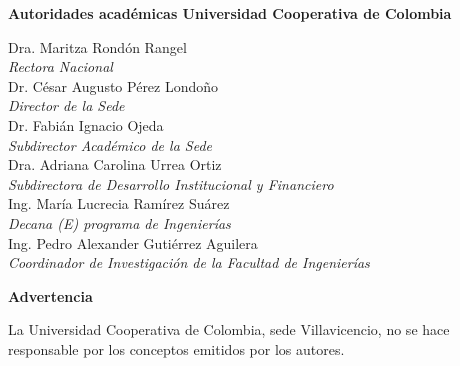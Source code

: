 \documentclass[12pt, letterpaper]{article}
\begin{document}
\newpage
\thispagestyle{empty}
\begin{center}
    \vspace*{2cm}
    {\large \bfseries Autoridades académicas Universidad Cooperativa de Colombia\par}
    \vspace{2cm}
\end{center}
\begin{flushleft}
    \large
    Dra. Maritza Rondón Rangel\\
    \textit{Rectora Nacional}\\[1cm]
    Dr. César Augusto Pérez Londoño\\
    \textit{Director de la Sede}\\[1cm]
    Dr. Fabián Ignacio Ojeda\\
    \textit{Subdirector Académico de la Sede}\\[1cm]
    Dra. Adriana Carolina Urrea Ortiz\\
    \textit{Subdirectora de Desarrollo Institucional y Financiero}\\[1cm]
    Ing. María Lucrecia Ramírez Suárez\\
    \textit{Decana (E) programa de Ingenierías}\\[1cm]
    Ing. Pedro Alexander Gutiérrez Aguilera\\
    \textit{Coordinador de Investigación de la Facultad de Ingenierías}\\[1cm]
\end{flushleft}

\newpage
\thispagestyle{empty}
\begin{center}
    \vspace*{3cm}
    {\large \bfseries Advertencia\par}
    \vspace{2cm}
    \large
    La Universidad Cooperativa de Colombia, sede Villavicencio, no se hace responsable por los conceptos emitidos por los autores.
\end{center}
\end{document}
